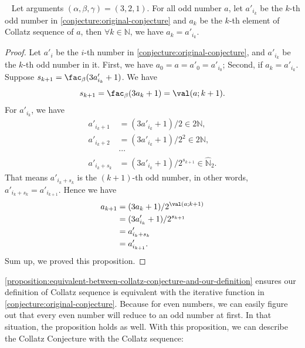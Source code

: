 \begin{proposition}~\label{proposition:equivalent-between-collatz-conjecture-and-our-definition}
Let arguments $(\alpha, \beta, \gamma) = (3, 2, 1)$.
For all odd number $a$, let $a'_{i_k}$ be the $k$-th odd number in \cref{conjecture:original-conjecture} and $a_k$ be the $k$-th element of Collatz sequence of $a$, then $\forall k \in \mathbb{N}$,  we have $a_{k} = a'_{i_{k}}$.
\end{proposition}
\begin{proof}
    Let $a'_{i}$ be the $i$-th number in \cref{conjecture:original-conjecture}, and $a'_{i_k}$ be the $k$-th odd number in it.\newline
    First, we have $a_{0} = a = a'_0 = a'_{i_0}$;\newline
    Second, if $a_{k} = a'_{i_k}$. Suppose $s_{k+1} = \fac_{\beta}(3a'_{i_k} + 1)$. We have
    \[ s_{k+1} = \fac_{\beta}(3a_k + 1) = \val(a;k+1). \]
    For $a'_{i_k}$, we have
    \begin{align*}
        a'_{i_k+1} &= (3a'_{i_k} + 1) / 2 \in 2\mathbb{N},   \\
        a'_{i_k+2} &= (3a'_{i_k} + 1) / 2^2 \in 2\mathbb{N}, \\
        &\cdots \\
        a'_{i_k+s_k} &= (3a'_{i_k} + 1) / 2^{s_{k+1}}  \in \widehat{\mathbb{N}}_{2}.
    \end{align*}
    That means $a'_{i_k+s_k}$ is the $(k+1)$-th odd number,  in other words, $a'_{i_k+s_k} = a'_{i_{k+1}}$.
    Hence we have
    \begin{align*}
        a_{k+1} &= (3a_k + 1) / 2^{\val(a;k+1)} \\
        &= (3a'_{i_k} + 1) / 2^{s_{k+1}} \\
        & = a'_{i_k+s_k} \\
        &= a'_{i_{k+1}}.
    \end{align*}
    Sum up, we proved this proposition.
\end{proof}
\cref{proposition:equivalent-between-collatz-conjecture-and-our-definition} ensures our definition of Collatz sequence is equivalent with the iterative function in \cref{conjecture:original-conjecture}.
Because for even numbers, we can easily figure out that every even number will reduce to an odd number at first.
In that situation, the proposition holds as well.
With this proposition, we can describe the Collatz Conjecture with the Collatz sequence:

